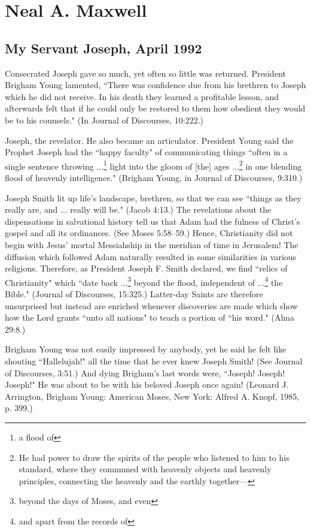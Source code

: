\section{Neal A. Maxwell}

\subsection{My Servant Joseph, April 1992}

Consecrated Joseph gave so much, yet often so little was returned. President Brigham Young lamented, ``There was confidence due from his brethren to Joseph which he did not receive. In his death they learned a profitable lesson, and afterwards felt that if he could only be restored to them how obedient they would be to his counsels." (In Journal of Discourses, 10:222.)

Joseph, the revelator. He also became an articulator. President Young said the Prophet Joseph had the ``happy faculty" of communicating things ``often in a single sentence throwing ...\footnote{a flood of} light into the gloom of [the] ages ...\footnote{He had power to draw the spirits of the people who listened to him to his standard, where they communed with heavenly objects and heavenly principles, connecting the heavenly and the earthly together—} in one blending flood of heavenly intelligence." (Brigham Young, in Journal of Discourses, 9:310.)

Joseph Smith lit up life's landscape, brethren, so that we can see ``things as they really are, and ... really will be." (Jacob 4:13.) The revelations about the dispensations in salvational history tell us that Adam had the fulness of Christ's gospel and all its ordinances. (See Moses 5:58–59.) Hence, Christianity did not begin with Jesus' mortal Messiahship in the meridian of time in Jerusalem! The diffusion which followed Adam naturally resulted in some similarities in various religions. Therefore, as President Joseph F. Smith declared, we find ``relics of Christianity" which ``date back ...\footnote{beyond the days of Moses, and even} beyond the flood, independent of ...\footnote{and apart from the records of} the Bible." (Journal of Discourses, 15:325.) Latter-day Saints are therefore unsurprised but instead are enriched whenever discoveries are made which show how the Lord grants ``unto all nations" to teach a portion of ``his word." (Alma 29:8.)

Brigham Young was not easily impressed by anybody, yet he said he felt like shouting ``Hallelujah!" all the time that he ever knew Joseph Smith! (See Journal of Discourses, 3:51.) And dying Brigham's last words were, ``Joseph! Joseph! Joseph!" He was about to be with his beloved Joseph once again! (Leonard J. Arrington, Brigham Young: American Moses, New York: Alfred A. Knopf, 1985, p. 399.)


